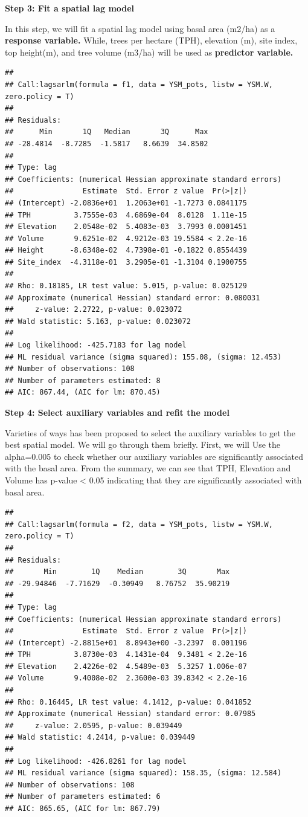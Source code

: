 \documentclass[
]{book}
\begin{document}
\textbf{Step 3: Fit a spatial lag model}

In this step, we will fit a spatial lag model using basal area (m2/ha) as a \textbf{response variable.} While, trees per hectare (TPH), elevation (m), site index, top height(m), and tree volume (m3/ha) will be used as \textbf{predictor variable.}

\begin{verbatim}
## 
## Call:lagsarlm(formula = f1, data = YSM_pots, listw = YSM.W, zero.policy = T)
## 
## Residuals:
##      Min       1Q   Median       3Q      Max 
## -28.4814  -8.7285  -1.5817   8.6639  34.8502 
## 
## Type: lag 
## Coefficients: (numerical Hessian approximate standard errors) 
##                Estimate  Std. Error z value  Pr(>|z|)
## (Intercept) -2.0836e+01  1.2063e+01 -1.7273 0.0841175
## TPH          3.7555e-03  4.6869e-04  8.0128  1.11e-15
## Elevation    2.0548e-02  5.4083e-03  3.7993 0.0001451
## Volume       9.6251e-02  4.9212e-03 19.5584 < 2.2e-16
## Height      -8.6348e-02  4.7398e-01 -0.1822 0.8554439
## Site_index  -4.3118e-01  3.2905e-01 -1.3104 0.1900755
## 
## Rho: 0.18185, LR test value: 5.015, p-value: 0.025129
## Approximate (numerical Hessian) standard error: 0.080031
##     z-value: 2.2722, p-value: 0.023072
## Wald statistic: 5.163, p-value: 0.023072
## 
## Log likelihood: -425.7183 for lag model
## ML residual variance (sigma squared): 155.08, (sigma: 12.453)
## Number of observations: 108 
## Number of parameters estimated: 8 
## AIC: 867.44, (AIC for lm: 870.45)
\end{verbatim}

\textbf{Step 4: Select auxiliary variables and refit the model}

Varieties of ways has been proposed to select the auxiliary variables to get the best spatial model. We will go through them briefly. First, we will Use the alpha=0.005 to check whether our auxiliary variables are significantly associated with the basal area. From the summary, we can see that TPH, Elevation and Volume has p-value \textless{} 0.05 indicating that they are significantly associated with basal area.

\begin{verbatim}
## 
## Call:lagsarlm(formula = f2, data = YSM_pots, listw = YSM.W, zero.policy = T)
## 
## Residuals:
##       Min        1Q    Median        3Q       Max 
## -29.94846  -7.71629  -0.30949   8.76752  35.90219 
## 
## Type: lag 
## Coefficients: (numerical Hessian approximate standard errors) 
##                Estimate  Std. Error z value  Pr(>|z|)
## (Intercept) -2.8815e+01  8.8943e+00 -3.2397  0.001196
## TPH          3.8730e-03  4.1431e-04  9.3481 < 2.2e-16
## Elevation    2.4226e-02  4.5489e-03  5.3257 1.006e-07
## Volume       9.4008e-02  2.3600e-03 39.8342 < 2.2e-16
## 
## Rho: 0.16445, LR test value: 4.1412, p-value: 0.041852
## Approximate (numerical Hessian) standard error: 0.07985
##     z-value: 2.0595, p-value: 0.039449
## Wald statistic: 4.2414, p-value: 0.039449
## 
## Log likelihood: -426.8261 for lag model
## ML residual variance (sigma squared): 158.35, (sigma: 12.584)
## Number of observations: 108 
## Number of parameters estimated: 6 
## AIC: 865.65, (AIC for lm: 867.79)
\end{verbatim}
\end{document}
